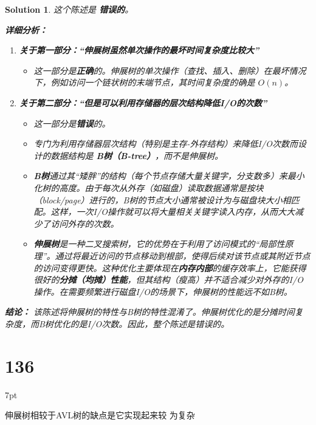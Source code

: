 \documentclass[UTF8]{report}
\newtheorem{solution}{Solution}
\theoremstyle{MyLineTheoremStyle} %
\theoremstyle{MyBlockTheoremStyle} %
\theoremstyle{MySubsubsectionStyle} %
\newenvironment{graybox}{%
        \def\FrameCommand{%
        \hspace{1pt}%
        {\color{gray}\small \vrule width 2pt}%
        {\color{graybox_color}\vrule width 4pt}%
        \colorbox{graybox_color}%
        }%
        \MakeFramed{\advance\hsize-\width\FrameRestore}%
        \noindent\hspace{-4.55pt}%
        \begin{adjustwidth}{}{7pt}%
        \vspace{2pt}\vspace{2pt}%
        }
        {%
        \vspace{2pt}\end{adjustwidth}\endMakeFramed%
        }
\begin{document}
\begin{solution}
这个陈述是 \textbf{错误的}。

\textbf{详细分析：}

\begin{enumerate}
    \item \textbf{关于第一部分：“伸展树虽然单次操作的最坏时间复杂度比较大”}
    \begin{itemize}
        \item 这一部分是\textbf{正确}的。伸展树的单次操作（查找、插入、删除）在最坏情况下，例如访问一个链状树的末端节点，其时间复杂度的确是 $O(n)$。
    \end{itemize}

    \item \textbf{关于第二部分：“但是可以利用存储器的层次结构降低I/O的次数”}
    \begin{itemize}
        \item 这一部分是\textbf{错误}的。
        \item 专门为利用存储器层次结构（特别是主存-外存结构）来降低I/O次数而设计的数据结构是 \textbf{B树（B-tree）}，而不是伸展树。
        \item \textbf{B树}通过其“矮胖”的结构（每个节点存储大量关键字，分支数多）来最小化树的高度。由于每次从外存（如磁盘）读取数据通常是按块（block/page）进行的，B树的节点大小通常被设计为与磁盘块大小相匹配。这样，一次I/O操作就可以将大量相关关键字读入内存，从而大大减少了访问外存的次数。
        \item \textbf{伸展树}是一种二叉搜索树，它的优势在于利用了访问模式的“局部性原理”。通过将最近访问的节点移动到根部，使得后续对该节点或其附近节点的访问变得更快。这种优化主要体现在\textbf{内存内部}的缓存效率上，它能获得很好的\textbf{分摊（均摊）性能}，但其结构（瘦高）并不适合减少对外存的I/O操作。在需要频繁进行磁盘I/O的场景下，伸展树的性能远不如B树。
    \end{itemize}
\end{enumerate}

\textbf{结论：}
该陈述将伸展树的特性与B树的特性混淆了。伸展树优化的是分摊时间复杂度，而B树优化的是I/O次数。因此，整个陈述是错误的。
\end{solution}

\section*{136}
\begin{graybox}
伸展树相较于AVL树的缺点是它实现起来较
为复杂
\end{graybox}
\end{document}
